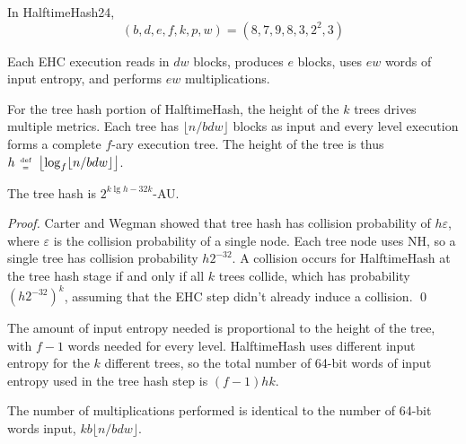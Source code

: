 \documentclass[runningheads]{llncs}
\newcommand{\defeq}{\;\genfrac{}{}{0pt}{2}{\text{def}}{=}\;}
\begin{document}
In HalftimeHash24, \[(b, d, e, f, k, p, w) = (8, 7, 9, 8, 3, 2^2, 3)\]

Each EHC execution reads in $d w$ blocks, produces $e$ blocks, uses $e w$ words of input entropy, and performs $e w$ multiplications.

For the tree hash portion of HalftimeHash, the height of the $k$ trees drives multiple metrics.
Each tree has $\lfloor n / b d w \rfloor$ blocks as input and every level execution forms a complete $f$-ary execution tree.
The height of the tree is thus $h \defeq \left\lfloor \log_f \lfloor n / b d w \rfloor \right\rfloor$.

\begin{lemma}
The tree hash is $2^{ k\lg h - 32k}$-AU.
\end{lemma}
\begin{proof}
  Carter and Wegman showed that tree hash has collision probability of $h \varepsilon$, where $\varepsilon$ is the collision probability of a single node.
  Each tree node uses NH, so a single tree has collision probability $h 2^{-32}$.
  A collision occurs for HalftimeHash at the tree hash stage if and only if all $k$ trees collide, which has probability $\left(h 2^{-32}\right)^k$, assuming that the EHC step didn't already induce a collision. \qed
\end{proof}

The amount of input entropy needed is proportional to the height of the tree, with $f - 1$ words needed for every level.
HalftimeHash uses different input entropy for the $k$ different trees, so the total number of 64-bit words of input entropy used in the tree hash step is $(f - 1) h k$.

The number of multiplications performed is identical to the number of 64-bit words input, $k b \lfloor n / b d w \rfloor$.

\end{document}
